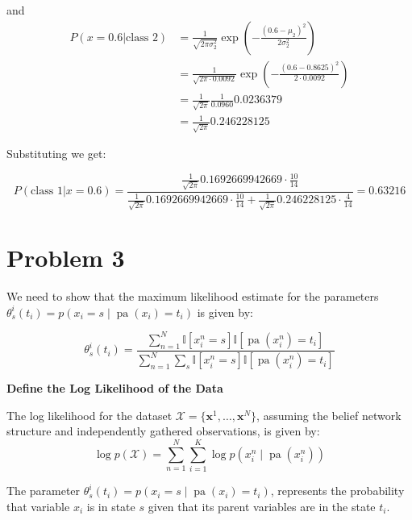 \documentclass{article}
\begin{document}
\begin{enumerate}
    
    and
    \[
    \begin{aligned}        
    P(x = 0.6 | \text{class } 2) 
    &= \frac{1}{\sqrt{2 \pi \sigma_2^2}} \exp\left(-\frac{(0.6 - \mu_2)^2}{2 \sigma_2^2}\right) \\
    &= \frac{1}{\sqrt{2 \pi \cdot 0.0092}} \exp\left(-\frac{(0.6 - 0.8625)^2}{2 \cdot 0.0092}\right) \\    
    &= \frac{1}{\sqrt{2 \pi }} \frac{1}{0.0960} 0.0236379   \\ 
    &= \frac{1}{\sqrt{2 \pi }} 0.246228125
    \end{aligned}
    \]

    Substituting we get:
    
     \[
    P(\text{class } 1 | x = 0.6) = \frac{ \frac{1}{\sqrt{2 \pi }}  0.1692669942669  \cdot \frac{10}{14}}{\frac{1}{\sqrt{2 \pi }}  0.1692669942669 \cdot \frac{10}{14} + \frac{1}{\sqrt{2 \pi }} 0.246228125 \cdot \frac{4}{14}} 
    = 0.63216
    \]

\end{enumerate}



\section*{Problem 3}



We need to show that the maximum likelihood estimate for the parameters \( \theta_s^i(t_i) = p(x_i = s \mid \operatorname{pa}(x_i) = t_i) \) is given by:

\[
\theta_s^i(t_i) = \frac{\sum_{n=1}^N \mathbb{I}\left[x_i^n = s\right] \mathbb{I}\left[\operatorname{pa}(x_i^n) = t_i\right]}{\sum_{n=1}^N \sum_s \mathbb{I}\left[x_i^n = s\right] \mathbb{I}\left[\operatorname{pa}(x_i^n) = t_i\right]}
\]

\textbf{Define the Log Likelihood of the Data}

The log likelihood for the dataset \( \mathcal{X} = \{ \mathbf{x}^1, \dots, \mathbf{x}^N \} \), assuming the belief network structure and independently gathered observations, is given by:
\[
\log p(\mathcal{X}) = \sum_{n=1}^N \sum_{i=1}^K \log p\left(x_i^n \mid \operatorname{pa}(x_i^n)\right)
\]


The parameter \( \theta_s^i(t_i) = p(x_i = s \mid \operatorname{pa}(x_i) = t_i) \), represents the probability that variable \( x_i \) is in state \( s \) given that its parent variables are in the state \( t_i \).
\end{document}
